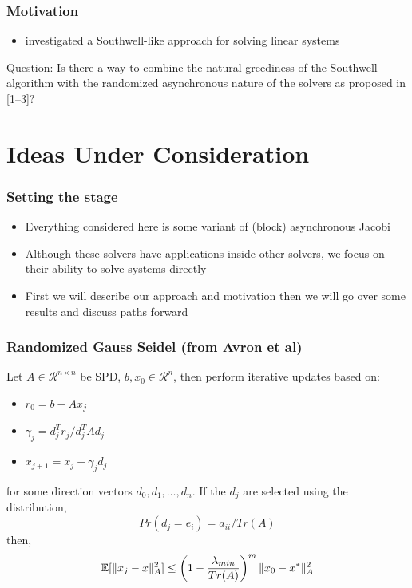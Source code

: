 \documentclass{beamer}
\DeclarePairedDelimiter{\norm}{\lVert}{\rVert}
\begin{document}
\begin{frame}
	\frametitle{Motivation}
	\begin{itemize}
		\item \textcite{wolfson2017distributed} investigated  a Southwell-like approach for solving linear systems
	\end{itemize}	
	\begin{block}{Question:}
	    Is there a way to combine the natural greediness of the Southwell algorithm with the randomized asynchronous nature of the solvers as proposed in [1--3]?
	\end{block}
\end{frame}


\section{Ideas Under Consideration}

\begin{frame}
	\frametitle{Setting the stage}
	\begin{itemize}
	    \item Everything considered here is some variant of (block) asynchronous Jacobi
		\item Although these solvers have applications inside other solvers, we focus on their ability to solve systems directly
        \item First we will describe our approach and motivation then we will go over some results and discuss paths forward
	\end{itemize}
\end{frame}

\begin{frame}
	\frametitle{Randomized Gauss Seidel (from Avron et al)}
    Let $A \in \mathcal{R}^{n\times n}$ be SPD, $b, x_0 \in \mathcal{R}^n$, then perform iterative updates based on:
        \begin{itemize}
            \item $r_0 = b - Ax_j$
            \item $\gamma_j = d^T_jr_j / d_j^TAd_j$
            \item $x_{j+1} = x_j + \gamma_j d_j$
        \end{itemize}
    for some direction vectors $d_0, d_1, \ldots, d_n$. If the $d_j$ are selected using the distribution,
        \begin{equation}
            Pr(d_j = e_i) = a_{ii} / Tr(A)
        \end{equation}
    then,
        \begin{equation}
            \mathbb{E}[\norm{x_j - x }_A^2] \leq \left( 1 - \frac{\lambda_{min}}{Tr(A)}\right)^m \norm{x_0 - x^*}_A^2
        \end{equation}
\end{frame}
\end{document}
